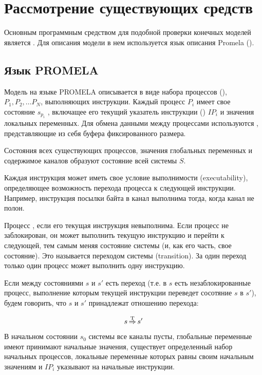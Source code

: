 \chapter{Рассмотрение существующих средств}
\label{cha:analogues}

Основным программным средством для подобной проверки конечных моделей
является  \cite{SpinRoot}. Для описания модели в нем используется язык описания
Promela ().

\section{Язык PROMELA}
\label{sec:promela}

Модель на языке PROMELA описывается в виде набора процессов
(), $P_1, P_2, ... P_N$, выполняющих инструкции. Каждый
процесс $P_i$ имеет свое состояние $s_{p_i}$ , включащее его текущий указатель
инструкции () $IP_i$ и значения
локальных переменных. Для обмена данными между процессами используются
, представляющие из себя буфера фиксированного размера.

Состояния всех существующих процессов, значения глобальных переменных
и содержимое каналов образуют состояние всей системы $S$.

Каждая инструкция может иметь свое условие выполнимости
(executability), определяющее возможность перехода процесса к
следующей инструкции. Например, инструкция посылки байта в канал
выполнима тогда, когда канал не полон.

Процесс , если его текущая инструкция
невыполнима. Если процесс не заблокирован, он может выполнить текущую
инструкцию и перейти к следующей, тем самым меняя состояние системы
(и, как его часть, свое состояние). Это называется переходом системы
(transition). За один переход только один процесс может выполнить одну
инструкцию.

Если между состояниями $s$ и $s'$ есть переход (т.е. в $s$ есть
незаблокированные процесс, выполнение которым текущей инструкции
переведет сосотяние $s$ в $s'$), будем говорить, что $s$ и $s'$
принадлежат отношению перехода:

\begin{equation}
  \label{eq:statetrans-def}
  s \operatorname{\operatorname*{\Rightarrow}^T} s'
\end{equation}

В начальном состоянии $s_0$ системы все каналы пусты, глобальные переменные
имеют принимают начальные значения, существует определенный набор
начальных процессов, локальные переменные которых равны своим
начальным значениям и $IP_i$ указывают на начальные инструкции. 

